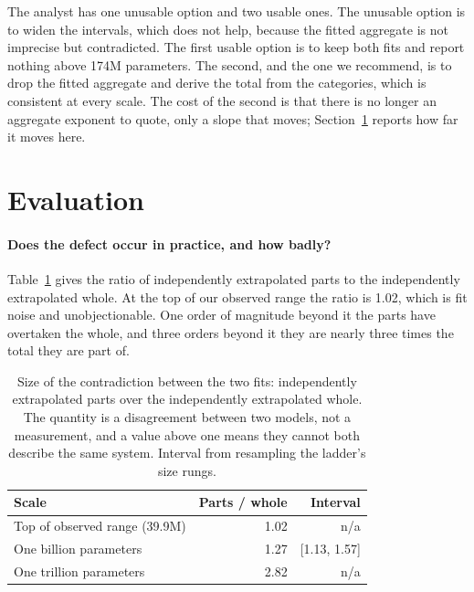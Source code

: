 \documentclass[11pt]{article}
\begin{document}
The analyst has one unusable option and two usable ones. The unusable option is to
widen the intervals, which does not help, because the fitted aggregate is not
imprecise but contradicted. The first usable option is to keep both fits and report
nothing above 174M parameters. The second, and the one we
recommend, is to drop the fitted aggregate and derive the total from the categories,
which is consistent at every scale. The cost of the second is that there is no
longer an aggregate exponent to quote, only a slope that moves;
Section~\ref{sec:eval} reports how far it moves here.

\section{Evaluation}
\label{sec:eval}

\paragraph{Does the defect occur in practice, and how badly?}
Table~\ref{tab:overspend} gives the ratio of independently extrapolated parts to the
independently extrapolated whole. At the top of our observed range the ratio is
1.02, which is fit noise and unobjectionable. One order of
magnitude beyond it the parts have overtaken the whole, and three orders beyond it
they are nearly three times the total they are part of.

\begin{table}[t]
\centering
\caption{Size of the contradiction between the two fits: independently extrapolated
parts over the independently extrapolated whole. The quantity is a disagreement
between two models, not a measurement, and a value above one means they cannot both
describe the same system. Interval from resampling the ladder's size rungs.}
\label{tab:overspend}
\small
\begin{tabular}{@{}lrr@{}}
\toprule
\textbf{Scale} & \textbf{Parts / whole} & \textbf{Interval} \\
\midrule
Top of observed range (39.9M) & 1.02 & n/a \\
One billion parameters & 1.27 &
[1.13, 1.57] \\
One trillion parameters & 2.82 & n/a \\
\bottomrule
\end{tabular}
\end{table}
\end{document}
